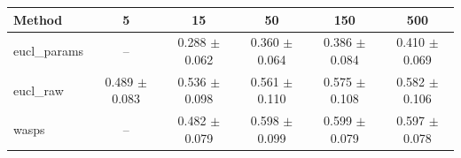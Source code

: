 \begin{table}[htbp]
\centering
\begin{NiceTabular}{lccccc}
\toprule
Method & 5 & 15 & 50 & 150 & 500 \\
\midrule
eucl\_params & -- & 0.288 $\pm$ 0.062 & 0.360 $\pm$ 0.064 & 0.386 $\pm$ 0.084 & 0.410 $\pm$ 0.069 \\
eucl\_raw & 0.489 $\pm$ 0.083 & 0.536 $\pm$ 0.098 & 0.561 $\pm$ 0.110 & 0.575 $\pm$ 0.108 & 0.582 $\pm$ 0.106 \\
wasps & -- & 0.482 $\pm$ 0.079 & 0.598 $\pm$ 0.099 & 0.599 $\pm$ 0.079 & 0.597 $\pm$ 0.078 \\
\bottomrule
\end{NiceTabular}
\label{tab:sens_cpazmal_n_samples_knn}
\end{table}
